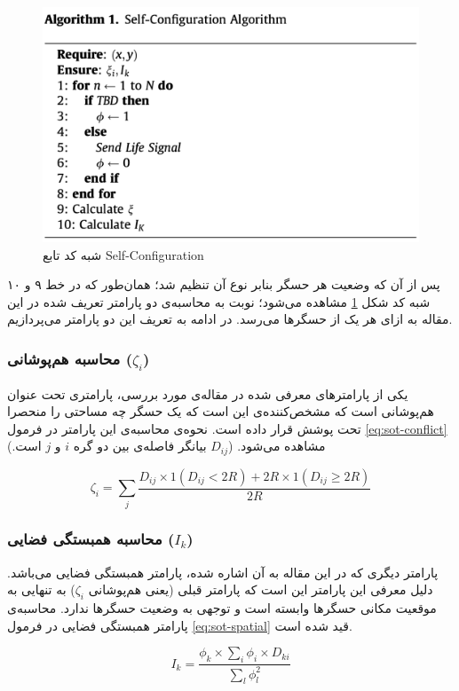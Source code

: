 \begin{figure}
	\centering
	\includegraphics[width=0.7\linewidth]{figs/sot-al1}
	\caption {شبه کد تابع Self-Configuration}
	\label{fig:sot-al1}
\end{figure}

\par
پس از آن که وضعیت هر حسگر بنابر نوع آن تنظیم شد؛ همان‌طور که در خط ۹ و ۱۰ شبه کد شکل \ref{fig:sot-al1} مشاهده می‌شود؛ نوبت به محاسبه‌ی دو پارامتر تعریف شده در این مقاله به ازای هر یک از حسگر‌ها می‌رسد. در ادامه به تعریف این دو پارامتر می‌پردازیم.

\subsubsection{
محاسبه هم‌پوشانی ($\zeta_i$)
}
یکی از پارامترهای معرفی شده در مقاله‌ی مورد بررسی، پارامتری تحت عنوان هم‌پوشانی است که مشخص‌کننده‌ی این است که یک حسگر چه مساحتی را منحصرا تحت پوشش قرار داده است. نحوه‌ی محاسبه‌ی این پارامتر در فرمول \ref{eq:sot-conflict} مشاهده می‌شود. ($D_{ij}$ بیانگر فاصله‌ی بین دو گره $i$ و $j$ است.)

\begin{equation}
\zeta_i = \sum_j \frac{D_{ij} \times 1(D_{ij} < 2R) + 2R \times 1(D_{ij} \geq 2R)}{2R}
\label{eq:sot-conflict}
\end{equation}

\subsubsection{
محاسبه همبستگی فضایی ($I_k$)
}
پارامتر دیگری که در این مقاله به آن اشاره شده، پارامتر همبستگی فضایی می‌باشد. دلیل معرفی این پارامتر این است که پارامتر قبلی (یعنی هم‌پوشانی $\zeta_i$) به تنهایی به موقعیت مکانی حسگرها وابسته است و توجهی به وضعیت حسگرها ندارد. محاسبه‌ی پارامتر همبستگی فضایی در فرمول \ref{eq:sot-spatial} قید شده است.

\begin{equation}
I_k = \frac{\phi_k \times \sum_i \phi_i \times D_{ki}}{\sum_l \phi_l^2}
\label{eq:sot-spatial}
\end{equation}

